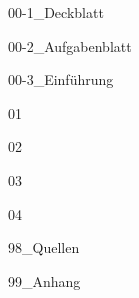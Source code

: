 \documentclass[11pt]{article}
\begin{document}

{00-1_Deckblatt}
\pagebreak

{00-2_Aufgabenblatt}
\pagebreak

\setcounter{section}{-1} 
\tableofcontents
\pagebreak

\setcounter{page}{1}

{00-3_Einführung}
\pagebreak

{01}
\pagebreak

{02}
\pagebreak

{03}
\pagebreak

{04}
\pagebreak

{98_Quellen}
\pagebreak

{99_Anhang}
\end{document}
